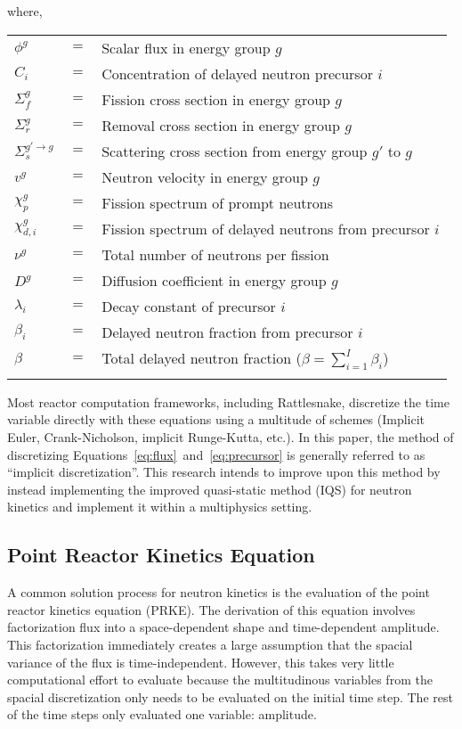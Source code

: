 where,

\begin{tabular}{lll}
$\phi^g$   			&	$=$	&	Scalar flux in energy group $g$ \\
$C_i$					  &	$=$	&	Concentration of delayed neutron precursor $i$ \\
$\Sigma_f^{g}$	&	$=$	&	Fission cross section in energy group $g$ \\
$\Sigma_r^{g}$	&	$=$	&	Removal cross section in energy group $g$ \\
$\Sigma_s^{g' \to g}$	&	$=$	&	Scattering cross section from energy group $g'$ to $g$ \\
$v^g$					  &	$=$	&	Neutron velocity in energy group $g$ \\
$\chi_p^g$			&	$=$	&	Fission spectrum of prompt neutrons \\
$\chi_{d,i}^g$	&	$=$	&	Fission spectrum of delayed neutrons from precursor $i$ \\
$\nu^g$					&	$=$	&	Total number of neutrons per fission \\
$D^g$					  &	$=$	&	Diffusion coefficient in energy group $g$\\
$\lambda_i$			&	$=$	&	Decay constant of precursor $i$ \\
$\beta_i$				&	$=$	&	Delayed neutron fraction  from precursor $i$ \\
$\beta$			 	  &	$=$	&	Total delayed neutron fraction ($\beta = \sum_{i=1}^I \beta_{i}$) \\
  & & 
\end{tabular}

Most reactor computation frameworks, including Rattlesnake, discretize the time variable directly with these equations using a multitude of schemes (Implicit Euler, Crank-Nicholson, implicit Runge-Kutta, etc.).  In this paper, the method of discretizing Equations~\ref{eq:flux}~and~\ref{eq:precursor} is generally referred to as ``implicit discretization''.  This research intends to improve upon this method by instead implementing the improved quasi-static method (IQS) for neutron kinetics and
implement it within a multiphysics setting. \\

\subsection{Point Reactor Kinetics Equation}

A common solution process for neutron kinetics is the evaluation of the point reactor kinetics equation (PRKE).  The derivation of this equation involves factorization flux into a space-dependent shape and time-dependent amplitude.  This factorization immediately creates a large assumption that the spacial variance of the flux is time-independent.  However, this takes very little computational effort to evaluate because the multitudinous variables from the spacial discretization only needs to be evaluated on the initial time step.  The rest of the time steps only evaluated one variable: amplitude.


